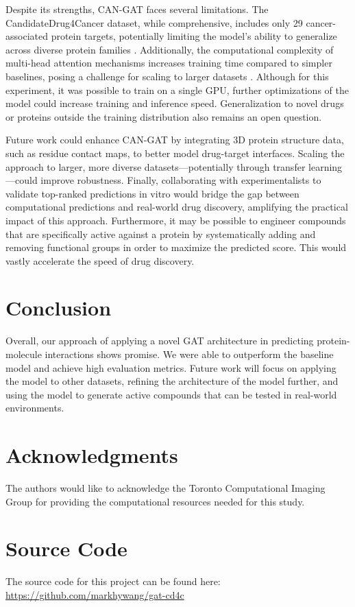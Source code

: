 \documentclass[fontsize=11pt]{article}
\begin{document}
Despite its strengths, CAN-GAT faces several limitations. The CandidateDrug4Cancer dataset, while comprehensive, includes only 29 cancer-associated protein targets, potentially limiting the model's ability to generalize across diverse protein families \cite{Ye2022}. Additionally, the computational complexity of multi-head attention mechanisms increases training time compared to simpler baselines, posing a challenge for scaling to larger datasets \cite{Kanakala2023}. Although for this experiment, it was possible to train on a single GPU, further optimizations of the model could increase training and inference speed. Generalization to novel drugs or proteins outside the training distribution also remains an open question. 

Future work could enhance CAN-GAT by integrating 3D protein structure data, such as residue contact maps, to better model drug-target interfaces. Scaling the approach to larger, more diverse datasets—potentially through transfer learning \cite{Ouyang2024}—could improve robustness. Finally, collaborating with experimentalists to validate top-ranked predictions in vitro would bridge the gap between computational predictions and real-world drug discovery, amplifying the practical impact of this approach. Furthermore, it may be possible to engineer compounds that are specifically active against a protein by systematically adding and removing functional groups in order to maximize the predicted score. This would vastly accelerate the speed of drug discovery.

\section*{Conclusion}
Overall, our approach of applying a novel GAT architecture in predicting protein-molecule interactions shows promise. We were able to outperform the baseline model and achieve high evaluation metrics. Future work will focus on applying the model to other datasets, refining the architecture of the model further, and using the model to generate active compounds that can be tested in real-world environments. 

\section*{Acknowledgments}
The authors would like to acknowledge the Toronto Computational Imaging Group for providing the computational resources needed for this study.

\section*{Source Code}
The source code for this project can be found here: \url{https://github.com/markhywang/gat-cd4c}
\printbibliography
\end{document}
